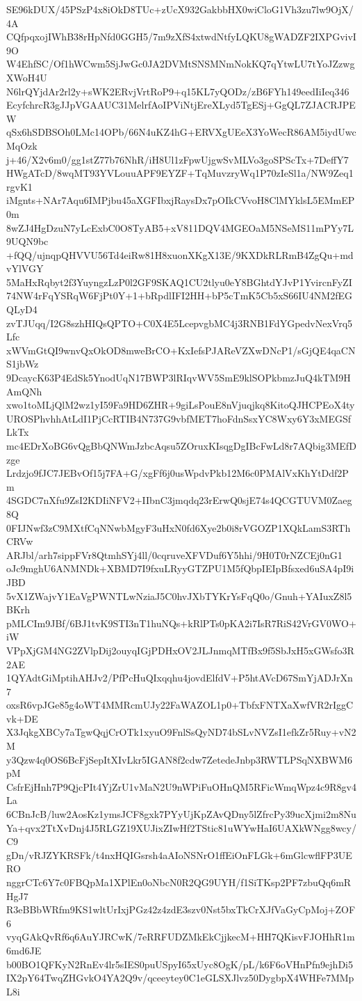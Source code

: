 SE96kDUX/45PSzP4x8iOkD8TUc+zUcX932GakbbHX0wiCloG1Vh3zu7lw9OjX/4A
CQfpqxojIWhB38rHpNfd0GGH5/7m9zXfS4xtwdNtfyLQKU8gWADZF2IXPGvivI9O
W4EhfSC/Of1hWCwm5SjJwGc0JA2DVMtSNSMNmNokKQ7qYtwLU7tYoJZzwgXWoH4U
N6lrQYjdAr2rl2y+sWK2ERvjVrtRoP9+q15KL7yQODz/zB6FYh149eedIiIeq346
EcyfchrcR3gJJpVGAAUC31MelrfAoIPViNtjEreXLyd5TgESj+GgQL7ZJACRJPEW
qSx6hSDBSOh0LMc14OPb/66N4uKZ4hG+ERVXgUEeX3YoWecR86AM5iydUwcMqOzk
j+46/X2v6m0/gg1stZ77b76NhR/iH8Ul1zFpwUjgwSvMLVo3goSPScTx+7DeffY7
HWgATcD/8wqMT93YVLouuAPF9EYZF+TqMuvzryWq1P70zIeSl1a/NW9Zeq1rgvK1
iMgnts+NAr7Aqu6IMPjbu45aXGFIbxjRaysDx7pOIkCVvoH8ClMYklsL5EMmEP0m
8wZJ4HgDzuN7yLcExbC0O8TyAB5+xV811DQV4MGEOaM5NSeMS11mPYy7L9UQN9bc
+fQQ/ujnqpQHVVU56Td4eiRw81H8xuonXKgX13E/9KXDkRLRmB4ZgQu+mdvYlVGY
5MaHxRqbyt2f3YuyngzLzP0l2GF9SKAQ1CU2tlyu0eY8BGhtdYJvP1YvircnFyZI
74NW4rFqYSRqW6FjPt0Y+1+bRpdlIFI2HH+bP5cTmK5Cb5xS66IU4NM2fEGQLyD4
zvTJUqq/I2G8szhHIQsQPTO+C0X4E5LcepvgbMC4j3RNB1FdYGpedvNexVrq5Lfc
xWVmGtQI9wnvQxOkOD8mweBrCO+KxIefsPJAReVZXwDNcP1/sGjQE4qaCNS1jbWz
9DcaycK63P4EdSk5YnodUqN17BWP3lRIqvWV5SmE9klSOPkbmzJuQ4kTM9HAmQNh
xwo1toMLjQlM2wz1yI59Fa9HD6ZHR+9giLsPouE8nVjuqjkq8KitoQJHCPEoX4ty
UROSPhvhhAtLdI1PjCcRTIB4N737G9vbfMET7hoFdnSsxYC8Wxy6Y3xMEGSfLkTx
mc4EDrXoBG6vQgBbQNWmJzbcAqsu5ZOruxKIsqgDgIBcFwLd8r7AQbig3MEfDzge
Lrdzjo9fJC7JEBvOf15j7FA+G/xgFf6j0usWpdvPkb12M6c0PMAlVxKhYtDdf2Pm
4SGDC7nXfu9ZsI2KDIiNFV2+IIbnC3jmqdq23rErwQ0sjE74s4QCGTUVM0Zaeg8Q
0FIJNwf3zC9MXtfCqNNwbMgyF3uHxN0fd6Xye2b0i8rVGOZP1XQkLamS3RThCRVw
ARJbl/arh7sippFVr8QtmhSYj4ll/0cqruveXFVDuf6Y5hhi/9H0T0rNZCEj0nG1
oJc9mghU6ANMNDk+XBMD7I9fxuLRyyGTZPU1M5fQbpIEIpBfsxed6uSA4pI9iJBD
5vX1ZWajvY1EaVgPWNTLwNziaJ5C0hvJXbTYKrYsFqQ0o/Gnuh+YAIuxZ8l5BKrh
pMLCIm9JBf/6BJ1tvK9STI3nT1huNQs+kRlPTs0pKA2i7IsR7RiS42VrGV0WO+iW
VPpXjGM4NG2ZVlpDij2ouyqIGjPDHxOV2JLJnmqMTfBx9f5SbJxH5xGWsfo3R2AE
1QYAdtGiMptihAHJv2/PfPcHuQIxqqhu4jovdElfdV+P5htAVcD67SmYjADJrXn7
oxsR6vpJGe85g4oWT4MMRcmUJy22FaWAZOL1p0+TbfxFNTXaXwfVR2rIggCvk+DE
X3JqkgXBCy7aTgwQqjCrOTk1xyuO9FnlSsQyND74bSLvNVZsI1efkZr5Ruy+vN2M
y3Qzw4q0OS6BcFjSepItXIvLkr5IGAN8f2cdw7ZetedeJnbp3RWTLPSqNXBWM6pM
CsfrEjHnh7P9QjcPIt4YjZrU1vMaN2U9nWPiFuOHnQM5RFicWmqWpz4c9R8gv4La
6CBnJcB/luw2AosKz1ymsJCF8gxk7PYyUjKpZAvQDny5lZfrcPy39ucXjmi2m8Nu
Ya+qvx2TtXvDnj4J5RLGZ19XUJixZIwHf2TStic81uWYwHaI6UAXkWNgg8wcy/C9
gDn/vRJZYKRSFk/t4nxHQIGsrsh4aAIoNSNrO1ffEiOnFLGk+6mGlcwflFP3UERO
nggrCTc6Y7c0FBQpMa1XPlEn0oNbcN0R2QG9UYH/f1SiTKsp2PF7zbuQq6mRHgJ7
R3eBBbWRfm9KS1wltUrIxjPGz42z4zdE3szv0Nst5bxTkCrXJfVaGyCpMoj+ZOF6
vyqGAkQvRf6q6AuYJRCwK/7eRRFUDZMkEkCjjkecM+HH7QKisvFJOHhR1m6md6JE
b00BO1QFKyN2RnEv4lr5sIES0puUSpyI65xUyc8OgK/pL/k6F6oVHnPfn9ejhDi5
IX2pY64TwqZHGvkO4YA2Q9v/qceeytey0C1eGLSXJlvz50DygbpX4WHFe7MMpL8i
